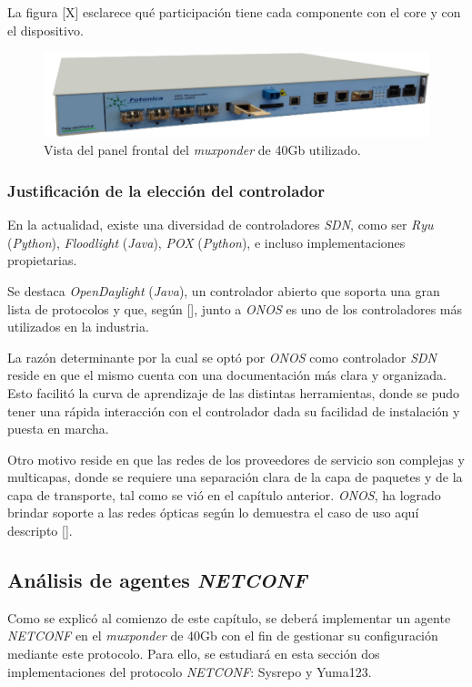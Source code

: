 La figura [X] esclarece qué participación tiene cada componente con el core y con el dispositivo.

\begin{figure}[H]
	\centering
	\includegraphics[scale=0.9]{Figures/mux40.pdf}
	\caption{Vista del panel frontal del \textit{muxponder} de 40Gb utilizado.}
	\label{fig:onosarchsouth}
  \end{figure}

  \subsubsection{Justificación de la elección del controlador}

En la actualidad, existe una diversidad de controladores \textit{SDN}, como ser \textit{Ryu} (\textit{Python}), \textit{Floodlight} (\textit{Java}), \textit{POX} (\textit{Python}), e incluso implementaciones propietarias. 

Se destaca \textit{OpenDaylight} (\textit{Java}), un controlador abierto que soporta una gran lista de protocolos y que, según [], junto a \textit{ONOS} es uno de los controladores más utilizados en la industria.

La razón determinante por la cual se optó por \textit{ONOS} como controlador \textit{SDN} reside en que el mismo cuenta con una documentación más clara y organizada. Esto facilitó la curva de aprendizaje de las distintas herramientas, donde se pudo tener una rápida interacción con el controlador dada su facilidad de instalación y puesta en marcha.

Otro motivo reside en que las redes de los proveedores de servicio son complejas y multicapas, donde se requiere una separación clara de la capa de paquetes y de la capa de transporte, tal como se vió en el capítulo anterior. \textit{ONOS}, ha logrado brindar soporte a las redes ópticas según lo demuestra el caso de uso aquí descripto [].

\subsection{Análisis de agentes \textit{NETCONF}}

Como se explicó al comienzo de este capítulo, se deberá implementar un agente \textit{NETCONF} en el \textit{muxponder} de 40Gb con el fin de gestionar su configuración mediante este protocolo. Para ello, se estudiará en esta sección dos implementaciones del protocolo \textit{NETCONF}: Sysrepo y Yuma123. 

